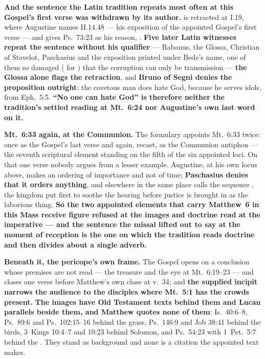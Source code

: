 \textbf{And the sentence the Latin tradition repeats most often at this
Gospel's first verse was withdrawn by its author.}  is retracted at  I.19,
where Augustine names  II.14.48 --- his
exposition of the appointed Gospel's first verse --- and gives Ps.\ 73:23 as his
reason, . \textbf{Five later Latin
witnesses repeat the sentence without his qualifier } --- Rabanus,
the Glossa, Christian of Stavelot, Paschasius and the exposition printed under
Bede's name, one of them so damaged ( for )
that the corruption can only be transmission --- \textbf{the Glossa alone flags
the retraction}, and \textbf{Bruno of Segni denies the proposition outright}:
the covetous man does hate God, because he serves idols, from Eph.\ 5:5.
\textbf{``No one can hate God'' is therefore neither the tradition's settled
reading at Mt.\ 6:24 nor Augustine's own last word on it.}

\textbf{Mt.\ 6:33 again, at the Communion.}
The formulary appoints Mt.\ 6:33 twice: once as the Gospel's last verse and
again, recast, as the Communion antiphon --- the seventh scriptural element
standing on the fifth of the six appointed loci. On that one verse nobody argues
from a lesser example. Augustine, at his own locus above, makes  an
ordering of importance and not of time; \textbf{Paschasius denies that it orders
anything}, and elsewhere in the same place calls the sequence
, the kingdom put first to soothe the hearing before justice
is brought in as the laborious thing. \textbf{So the two appointed elements that
carry Matthew~6 in this Mass receive figure refused at the images and doctrine
read at the imperative --- and the sentence the missal lifted out to say at the
moment of reception is the one on which the tradition reads doctrine and then
divides about a single adverb.}

\textbf{Beneath it, the pericope's own frame.} The Gospel opens on a conclusion
whose premises are not read --- the treasure and the eye at Mt.\ 6:19--23 ---
and closes one verse before Matthew's own close at v.~34; and \textbf{the
supplied incipit narrows the audience to the disciples where Mt.\ 5:1 has the
crowds present.} \textbf{The images have Old Testament texts behind them and
Lucan parallels beside them, and Matthew quotes none of them}: Is.\ 40:6--8,
Ps.\ 89:6 and Ps.\ 102:15--16 behind the grass, Ps.\ 146:9 and Job 38:41 behind
the birds, 3~Kings 10:4--7 and 10:23 behind Solomon, and Ps.\ 54:23 with
1~Pet.\ 5:7 behind the . They stand as background and none
is a citation the appointed text makes.

